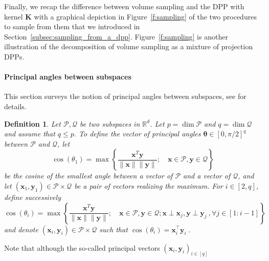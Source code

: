 \documentclass[twoside,11pt]{book}
\newtheorem{definition}{Definition}
\DeclareMathOperator{\Tran}{\intercal}
\begin{document}
Finally, we recap the difference between volume sampling and the DPP with kernel $\bm K$ with a graphical depiction in Figure~\ref{f:sampling} of the two procedures to sample from them that we introduced in Section~\ref{subsec:sampling_from_a_dpp}. Figure~\ref{f:sampling} is another illustration of the decomposition of volume sampling as a mixture of projection DPPs.
\paragraph{Principal angles between subspaces}
This section surveys the notion of principal angles between subspaces, see \cite[Section 6.4.3]{GoVa96} for details.
\begin{definition}
  \label{d:angles}
Let $\mathcal{P},\mathcal{Q}$ be two subspaces in $\mathbb{R}^{d}$. Let $p= \dim\mathcal{P}$ and $q = \dim\mathcal{Q}$ and assume that $q \leq p$. To define the vector of principal angles $\bm{\theta} \in [0,\pi/2]^{q}$ between $\mathcal{P}$ and $\mathcal{Q}$, let
\begin{equation}\label{eq:max_def_principal_angle_1}
 \cos(\theta_{1}) = \max \left\{ \frac{\bm{x}^{T}\bm{y}}{\|\bm{x}\|\|\bm{y}\|}; \quad \bm{x} \in \mathcal{P}, \bm{y} \in \mathcal{Q} \right\}
\end{equation}
be the cosine of the smallest angle between a vector of $\mathcal{P}$ and a vector of $\mathcal{Q}$, and let $(\bm{x}_{1},\bm{y}_{1}) \in \mathcal{P}\times \mathcal{Q}$ be a pair of vectors realizing the maximum. For $i \in [2,q]$, define successively
\begin{equation}\label{eq:max_def_principal_angles}
 \cos(\theta_{i}) = \max \left\{\frac{\bm{x}^{T}\bm{y}}{\|\bm{x}\|\|\bm{y}\|}; \quad \bm{x} \in \mathcal{P}, \bm{y} \in \mathcal{Q}; \bm{x} \perp \bm{x}_{j}, \bm{y} \perp \bm{y}_{j}\:, \forall j \in [1:i-1] \right\}
\end{equation}
and denote $(\bm{x}_{i},\bm{y}_{i}) \in \mathcal{P}\times\mathcal{Q}$ such that $\cos(\theta_{i}) = \bm{x}_{i}^{\Tran}\bm{y}_{i} \:$.
\end{definition}
Note that although the so-called principal vectors $(\bm{x}_{i},\bm{y}_{i})_{i \in [q]}$
\end{document}
